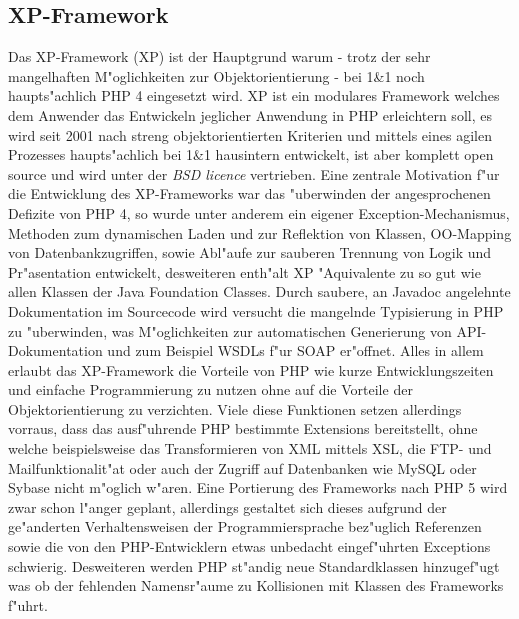 \subsection{XP-Framework}
\label{sec:intro:stand:xp}

Das XP-Framework \cite{XPHP} (XP) ist der Hauptgrund warum - trotz der sehr mangelhaften M"oglichkeiten zur 
Objektorientierung - bei 1\&1 noch haupts"achlich PHP 4 eingesetzt wird. XP ist ein modulares Framework welches
dem Anwender das Entwickeln jeglicher Anwendung in PHP erleichtern soll, es wird seit 2001 nach streng 
objektorientierten Kriterien und mittels eines agilen Prozesses haupts"achlich bei 1\&1 hausintern entwickelt,
ist aber komplett open source und wird unter der \emph{BSD licence} \cite{BSDLICENCE} vertrieben.
Eine zentrale Motivation f"ur die Entwicklung des XP-Frameworks war das "uberwinden der angesprochenen
Defizite von PHP 4, so wurde unter anderem ein eigener Exception-Mechanismus, Methoden zum dynamischen
Laden und zur Reflektion von Klassen, OO-Mapping von Datenbankzugriffen, sowie Abl"aufe zur sauberen 
Trennung von Logik und Pr"asentation entwickelt, desweiteren enth"alt XP "Aquivalente zu so gut wie allen Klassen 
der Java Foundation Classes.
Durch saubere, an Javadoc \cite{JAVADOC} angelehnte Dokumentation im Sourcecode wird versucht die mangelnde
Typisierung in PHP zu "uberwinden, was M"oglichkeiten zur automatischen Generierung von API-Dokumentation und zum
Beispiel WSDLs \cite{WSDLSPEC} f"ur SOAP er"offnet.
Alles in allem erlaubt das XP-Framework die Vorteile von PHP wie kurze Entwicklungszeiten und einfache 
Programmierung zu nutzen ohne auf die Vorteile der Objektorientierung zu verzichten.
Viele diese Funktionen setzen allerdings vorraus, dass das ausf"uhrende PHP bestimmte Extensions bereitstellt,
ohne welche beispielsweise das Transformieren von XML mittels XSL, die FTP- und Mailfunktionalit"at oder auch
der Zugriff auf Datenbanken wie MySQL oder Sybase nicht m"oglich w"aren.
Eine Portierung des Frameworks nach PHP 5 wird zwar schon l"anger geplant, allerdings gestaltet sich dieses 
aufgrund der ge"anderten Verhaltensweisen der Programmiersprache bez"uglich Referenzen sowie die von den PHP-Entwicklern
etwas unbedacht eingef"uhrten Exceptions schwierig. Desweiteren werden PHP st"andig neue Standardklassen
hinzugef"ugt was ob der fehlenden Namensr"aume zu Kollisionen mit Klassen des Frameworks f"uhrt.


